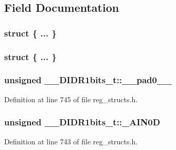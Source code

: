 \subsection{Field Documentation}
\hypertarget{union_____d_i_d_r1bits__t_a0c3187b54faa2ede6c0a3f4986c1e8f7}{\subsubsection[{"@179}]{\setlength{\rightskip}{0pt plus 5cm}struct \{ ... \} }}\label{union_____d_i_d_r1bits__t_a0c3187b54faa2ede6c0a3f4986c1e8f7}
\hypertarget{union_____d_i_d_r1bits__t_a0148cdcfb0e88cda4c7a4244852bfc48}{\subsubsection[{"@181}]{\setlength{\rightskip}{0pt plus 5cm}struct \{ ... \} }}\label{union_____d_i_d_r1bits__t_a0148cdcfb0e88cda4c7a4244852bfc48}
\hypertarget{union_____d_i_d_r1bits__t_a41f120ade4bbbf891be7c1254ff24ef0}{
\subsubsection[{\+\_\+\+\_\+pad0\+\_\+\+\_\+}]{\setlength{\rightskip}{0pt plus 5cm}unsigned \+\_\+\+\_\+\+D\+I\+D\+R1bits\+\_\+t\+::\+\_\+\+\_\+pad0\+\_\+\+\_\+}}\label{union_____d_i_d_r1bits__t_a41f120ade4bbbf891be7c1254ff24ef0}


Definition at line 745 of file reg\+\_\+structs.\+h.

\hypertarget{union_____d_i_d_r1bits__t_a3f4c3ce247e4f061fc8a77555d28323b}{
\subsubsection[{\+\_\+\+A\+I\+N0\+D}]{\setlength{\rightskip}{0pt plus 5cm}unsigned \+\_\+\+\_\+\+D\+I\+D\+R1bits\+\_\+t\+::\+\_\+\+A\+I\+N0\+D}}\label{union_____d_i_d_r1bits__t_a3f4c3ce247e4f061fc8a77555d28323b}


Definition at line 743 of file reg\+\_\+structs.\+h.


